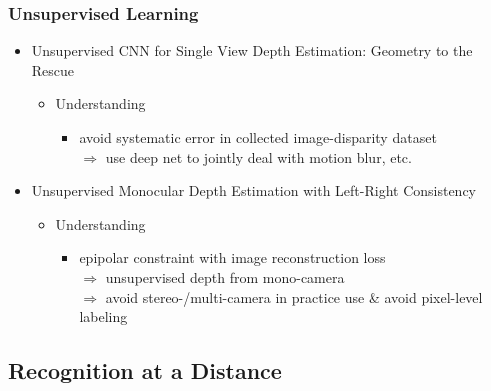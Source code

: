 \subsubsection{Unsupervised Learning}
\begin{itemize}
\item Unsupervised CNN for Single View Depth Estimation: Geometry to the Rescue
	\begin{itemize}
	\item Understanding
		\begin{itemize}
		\item avoid systematic error in collected image-disparity dataset \\
		$\Rightarrow$ use deep net to jointly deal with motion blur, etc. 
		\end{itemize}
	\end{itemize}
\item Unsupervised Monocular Depth Estimation with Left-Right Consistency
	\begin{itemize}
	\item Understanding
		\begin{itemize}
		\item epipolar constraint with image reconstruction loss \\
		$\Rightarrow$ unsupervised depth from mono-camera \\
		$\Rightarrow$ avoid stereo-/multi-camera in practice use \& avoid pixel-level labeling
		\end{itemize}
	\end{itemize}
\end{itemize}

\subsection{Recognition at a Distance}
